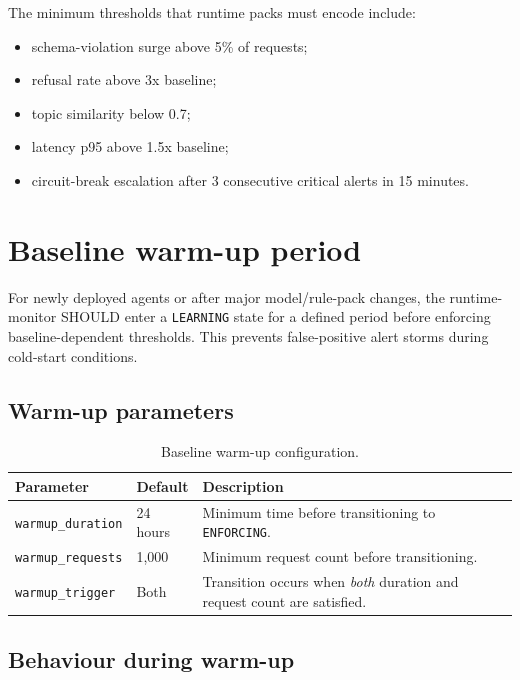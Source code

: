 \documentclass[11pt,a4paper,twoside]{report}
\begin{document}
The minimum thresholds that runtime packs must encode include:
\begin{itemize}
\item schema-violation surge above 5\% of requests;
\item refusal rate above 3x baseline;
\item topic similarity below 0.7;
\item latency p95 above 1.5x baseline;
\item circuit-break escalation after 3 consecutive critical alerts in
15 minutes.
\end{itemize}

\section{Baseline warm-up period}
\label{sec:baseline-warmup}

For newly deployed agents or after major model/rule-pack changes, the
runtime-monitor SHOULD enter a \texttt{LEARNING} state for a defined
period before enforcing baseline-dependent thresholds. This prevents
false-positive alert storms during cold-start conditions.

\subsection{Warm-up parameters}

\begin{table}[htbp]
\centering
\footnotesize
\caption{Baseline warm-up configuration.}
\label{tab:warmup-config}
\begin{tabularx}{\textwidth}{@{}l l X@{}}
\toprule
\textbf{Parameter} & \textbf{Default} & \textbf{Description} \\
\midrule
\texttt{warmup\_duration} & 24 hours & Minimum time before transitioning to \texttt{ENFORCING}. \\
\texttt{warmup\_requests} & 1{,}000 & Minimum request count before transitioning. \\
\texttt{warmup\_trigger} & Both & Transition occurs when \emph{both} duration and request count are satisfied. \\
\bottomrule
\end{tabularx}
\end{table}

\subsection{Behaviour during warm-up}
\end{document}

